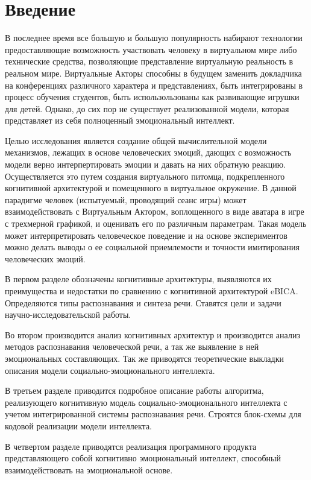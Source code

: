 \chapter*{Введение}
\label{sec:afterwords}


В последнее время все большую и большую популярность набирают технологии предоставляющие возможность участвовать человеку 
в виртуальном мире либо технические средства, позволяющие представление виртуальную реальность в реальном мире.
Виртуальные Акторы способны в будущем заменить докладчика на конференциях различного характера и представлениях,
быть интегрированы в процесс обучения студентов, быть использользованы как развивающие игрушки для детей.
Однако, до сих пор не существует реализованной модели, которая представляет из себя полноценный эмоциональный интеллект.

Целью исследования является создание общей вычислительной модели механизмов, лежащих в основе человеческих эмоций, 
дающих с возможность модели верно интерпертировать эмоции и давать на них обратную реакцию.
Осуществляется это путем создания виртуального питомца, подкрепленного когнитивной архитектурой и помещенного в виртуальное окружение. 
В данной парадигме человек (испытуемый, проводящий сеанс игры) может взаимодействовать с Виртуальным Актором, 
воплощенного в виде аватара в игре с трехмерной графикой, и оценивать его по различным параметрам. 
Такая модель может интерпретировать человеческое поведение и на основе экспериментов можно делать 
выводы о ее социальной приемлемости и точности имитирования человеческих эмоций.

В первом разделе обозначены когнитивные архитектуры, выявляются их преимущества и недостатки по 
сравнению с когнитивной архитектурой eBICA. Определяются типы распознавания и синтеза речи. 
Ставятся цели и задачи научно-исследовательской работы. 

Во втором производится анализ когнитивных архитектур и производится анализ методов распознавания человеческой речи, а так же выявление в ней эмоциональных составляющих.
Так же приводятся теоретические выкладки описания модели социально-эмоционального интеллекта. 

В третьем разделе приводится подробное описание работы алгоритма, реализующего когнитивную модель социально-эмоционального интеллекта с учетом
интегрированной системы распознавания речи.
Строятся блок-схемы для кодовой реализации модели интеллекта.

В четвертом разделе приводятся реализация программного продукта представляющего собой когнитивно эмоциональный интеллект, 
способный взаимодействовать на эмоциональной основе.